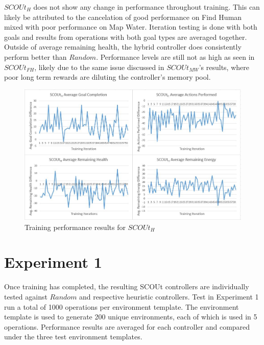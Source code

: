 $SCOUt_{H}$ does not show any change in performance throughout training.
This can likely be attributed to the cancelation of good performance on Find Human mixed with poor performance on Map Water.
Iteration testing is done with both goals and results from operations with both goal types are averaged together.
Outside of average remaining health, the hybrid controller does consistently perform better than $Random$.
Performance levels are still not as high as seen in $SCOUt_{FH}$, likely due to the same issue discussed in $SCOUt_{MW}$'s results, where poor long term rewards are diluting the controller's memory pool.

\begin{figure}[h]
  \includegraphics[width=1.0\columnwidth]{Figures/Results/Training/SCOUt-Hybrid.JPG}
  \caption{Training performance results for $SCOUt_{H}$}
  \label{fig:hybrid_training_results}
\end{figure}



\section{Experiment 1} \label{sec:experiment1}
Once training has completed, the resulting SCOUt controllers are individually tested against $Random$ and respective heuristic controllers.
Test in Experiment 1 run a total of 1000 operations per environment template.
The environment template is used to generate 200 unique environments, each of which is used in 5 operations.
Performance results are averaged for each controller and compared under the three test environment templates.


